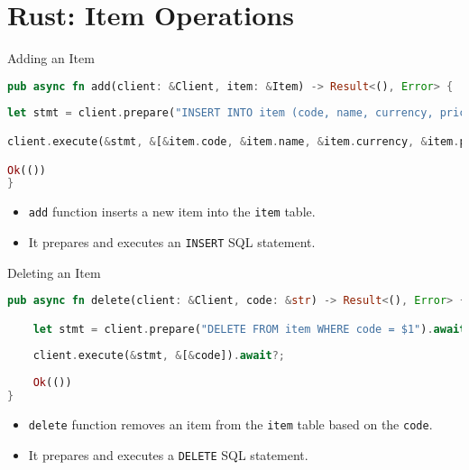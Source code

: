 \documentclass[aspectratio=169, table]{beamer}
\begin{document}
\section{Rust: Item Operations}
\begin{frame}[fragile]{Adding an Item}
\vspace{15pt}
\begin{lstlisting}[language=Rust]
pub async fn add(client: &Client, item: &Item) -> Result<(), Error> {
	
let stmt = client.prepare("INSERT INTO item (code, name, currency, price, quantity, unit) VALUES ($1, $2, $3, $4, $5, $6)",).await?;

client.execute(&stmt, &[&item.code, &item.name, &item.currency, &item.price, &item.quantity, &item.unit,],).await?;

Ok(())
}
\end{lstlisting}

\begin{itemize}
\item \texttt{add} function inserts a new item into the \texttt{item} table.
\item It prepares and executes an \texttt{INSERT} SQL statement.
\end{itemize}
\end{frame}

\begin{frame}[fragile]{Deleting an Item}
\vspace{15pt}
\begin{lstlisting}[language=Rust]
pub async fn delete(client: &Client, code: &str) -> Result<(), Error> {

	let stmt = client.prepare("DELETE FROM item WHERE code = $1").await?;
	
	client.execute(&stmt, &[&code]).await?;
	
	Ok(())
}
\end{lstlisting}

\begin{itemize}
\item \texttt{delete} function removes an item from the \texttt{item} table based on the \texttt{code}.
\item It prepares and executes a \texttt{DELETE} SQL statement.
\end{itemize}
\end{frame}
\end{document}
